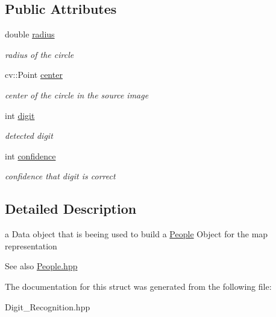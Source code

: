 \subsection*{Public Attributes}
\begin{DoxyCompactItemize}
\item 
\mbox{\label{struct_people_data_a8b6df3ca122413f40a7ef6b662589b9e}} 
double \mbox{\hyperlink{struct_people_data_a8b6df3ca122413f40a7ef6b662589b9e}{radius}}
\begin{DoxyCompactList}\small\item\em radius of the circle \end{DoxyCompactList}\item 
\mbox{\label{struct_people_data_a9744c97bd0d9b4582452eb8afec15b05}} 
cv\+::\+Point \mbox{\hyperlink{struct_people_data_a9744c97bd0d9b4582452eb8afec15b05}{center}}
\begin{DoxyCompactList}\small\item\em center of the circle in the source image \end{DoxyCompactList}\item 
\mbox{\label{struct_people_data_ac67414ff2db4d485a431b7a93cc02298}} 
int \mbox{\hyperlink{struct_people_data_ac67414ff2db4d485a431b7a93cc02298}{digit}}
\begin{DoxyCompactList}\small\item\em detected digit \end{DoxyCompactList}\item 
\mbox{\label{struct_people_data_a7c8aeadac63a7d20a5f8ca43f4f54237}} 
int \mbox{\hyperlink{struct_people_data_a7c8aeadac63a7d20a5f8ca43f4f54237}{confidence}}
\begin{DoxyCompactList}\small\item\em confidence that digit is correct \end{DoxyCompactList}\end{DoxyCompactItemize}


\subsection{Detailed Description}
a Data object that is beeing used to build a \mbox{\hyperlink{class_people}{People}} Object for the map representation 

\begin{DoxySeeAlso}{See also}
\mbox{\hyperlink{_people_8hpp_source}{People.\+hpp}} 
\end{DoxySeeAlso}


The documentation for this struct was generated from the following file\+:\begin{DoxyCompactItemize}
\item 
Digit\+\_\+\+Recognition.\+hpp\end{DoxyCompactItemize}
